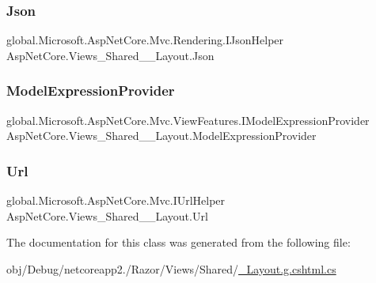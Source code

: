 \subsubsection{\texorpdfstring{Json}{Json}}
{\footnotesize\ttfamily global.\+Microsoft.\+Asp\+Net\+Core.\+Mvc.\+Rendering.\+I\+Json\+Helper Asp\+Net\+Core.\+Views\+\_\+\+Shared\+\_\+\+\_\+\+Layout.\+Json\hspace{0.3cm}{\ttfamily [get]}}

\mbox{\label{class_asp_net_core_1_1_views___shared_____layout_aac460ec4de4ed34a70fba1f432e30177}} 
\subsubsection{\texorpdfstring{ModelExpressionProvider}{ModelExpressionProvider}}
{\footnotesize\ttfamily global.\+Microsoft.\+Asp\+Net\+Core.\+Mvc.\+View\+Features.\+I\+Model\+Expression\+Provider Asp\+Net\+Core.\+Views\+\_\+\+Shared\+\_\+\+\_\+\+Layout.\+Model\+Expression\+Provider\hspace{0.3cm}{\ttfamily [get]}}

\mbox{\label{class_asp_net_core_1_1_views___shared_____layout_a6c45fa86aef386a351f71fe9e747c871}} 
\subsubsection{\texorpdfstring{Url}{Url}}
{\footnotesize\ttfamily global.\+Microsoft.\+Asp\+Net\+Core.\+Mvc.\+I\+Url\+Helper Asp\+Net\+Core.\+Views\+\_\+\+Shared\+\_\+\+\_\+\+Layout.\+Url\hspace{0.3cm}{\ttfamily [get]}}



The documentation for this class was generated from the following file\+:\begin{DoxyCompactItemize}
\item 
obj/\+Debug/netcoreapp2./\+Razor/\+Views/\+Shared/\mbox{\hyperlink{___layout_8g_8cshtml_8cs}{\+\_\+\+Layout.\+g.\+cshtml.\+cs}}\end{DoxyCompactItemize}
